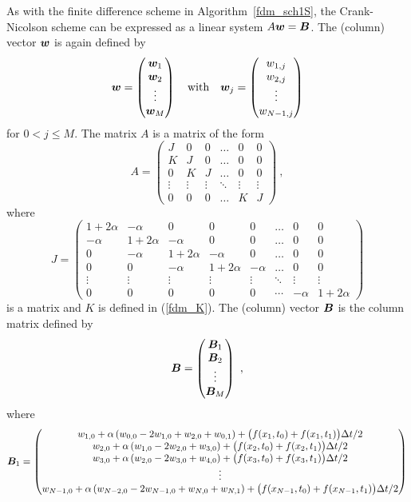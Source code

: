 As with the finite difference scheme in Algorithm~\ref{fdm_sch1S}, the
Crank-Nicolson scheme can be expressed as a linear system
$A \bm{w} = \bm{B}$.  The (column) vector $\bm{w}$ is again defined by
\[
\bm{w} = \begin{pmatrix}
\bm{w}_1 \\ \bm{w}_2 \\ \vdots \\ \bm{w}_M
\end{pmatrix}
\quad \text{with} \quad
\bm{w}_j =
\begin{pmatrix} w_{1,j} \\ w_{2,j} \\ \vdots \\ w_{N-1,j} \end{pmatrix}
\]
for $0 < j \leq M$. The matrix $A$ is a  matrix of
the form
\[
A = \begin{pmatrix}
J & 0 & 0 & \ldots & 0 & 0 \\
K & J & 0 & \ldots & 0 & 0 \\
0 & K & J & \ldots & 0 & 0 \\
\vdots & \vdots & \vdots & \ddots & \vdots & \vdots \\
0 & 0 & 0 & \ldots & K & J
\end{pmatrix} \ ,
\]
where
\begin{equation} \label{fdm_J}
J = \begin{pmatrix}
1+2\alpha & -\alpha & 0 & 0 & 0 & \ldots & 0 & 0 \\
-\alpha & 1 +2\alpha & -\alpha & 0 & 0 & \ldots & 0 & 0  \\
0 & -\alpha & 1 +2\alpha & -\alpha & 0 & \ldots & 0 & 0 \\
0 & 0 & -\alpha & 1 +2\alpha & -\alpha & \ldots & 0 & 0 \\
\vdots & \vdots & \vdots & \vdots & \vdots & \ddots & \vdots & \vdots \\
0 & 0 & 0 & 0 & 0 & \cdots & -\alpha & 1+2\alpha
\end{pmatrix}
\end{equation}
is a  matrix and $K$ is defined in (\ref{fdm_K}).
The (column) vector $\bm{B}$ is the column matrix defined by
\[
\bm{B} = \begin{pmatrix} \bm{B}_1 \\ \bm{B}_2 \\ \vdots \\
\bm{B}_M \end{pmatrix} \ ,
\]
where
\[
\bm{B}_1 = \begin{pmatrix} 
w_{1,0} + \alpha \left( w_{0,0} - 2 w_{1,0} + w_{2,0} + w_{0,1}\right)
+ \big(f(x_1,t_0) +f(x_1,t_1)\big) \Delta{t}/2 \\
w_{2,0} + \alpha \left( w_{1,0} - 2 w_{2,0} + w_{3,0}\right)
+ \big( f(x_2,t_0) + f(x_2,t_1)\big) \Delta{t}/2  \\
w_{3,0} + \alpha \left( w_{2,0} - 2 w_{3,0} + w_{4,0}\right)
+ \big( f(x_3,t_0) +f(x_3,t_1)\big) \Delta{t}/2 \\
\vdots \\
w_{N-1,0} + \alpha \left( w_{N-2,0} - 2 w_{N-1,0} + w_{N,0} + w_{N,1} \right)
+ \big( f(x_{N-1},t_0) +f(x_{N-1},t_1)\big) \Delta{t}/2
\end{pmatrix}
\]
